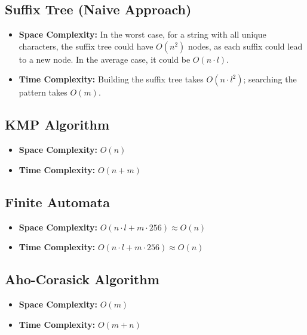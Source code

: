 \documentclass[11pt,a4paper]{article}
\begin{document}
\subsection{Suffix Tree (Naive Approach)}
\begin{itemize}
    \item \textbf{Space Complexity:} In the worst case, for a string with all unique characters, the suffix tree could have \( O(n^2) \) nodes, as each suffix could lead to a new node. In the average case, it could be \( O(n \cdot l) \).
    \item \textbf{Time Complexity:} Building the suffix tree takes \( O(n \cdot l^2) \); searching the pattern takes \( O(m) \).
\end{itemize}

\subsection{KMP Algorithm}
\begin{itemize}
    \item \textbf{Space Complexity:} \( O(n) \)
    \item \textbf{Time Complexity:} \( O(n + m) \)
\end{itemize}

\subsection{Finite Automata}
\begin{itemize}
    \item \textbf{Space Complexity:} \( O(n \cdot l + m \cdot 256) \approx O(n) \)
    \item \textbf{Time Complexity:} \( O(n \cdot l + m \cdot 256) \approx O(n) \)
\end{itemize}

\subsection{Aho-Corasick Algorithm}
\begin{itemize}
    \item \textbf{Space Complexity:} \( O(m) \)
    \item \textbf{Time Complexity:} \( O(m + n) \)
\end{itemize}
\end{document}

